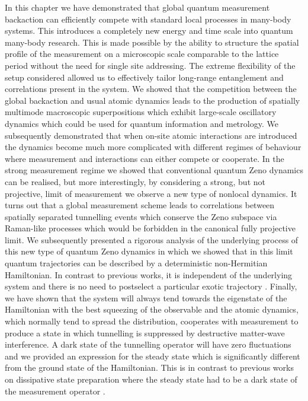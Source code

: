 In this chapter we have demonstrated that global quantum measurement
backaction can efficiently compete with standard local processes in
many-body systems. This introduces a completely new energy and time
scale into quantum many-body research. This is made possible by the
ability to structure the spatial profile of the measurement on a
microscopic scale comparable to the lattice period without the need
for single site addressing. The extreme flexibility of the setup
considered allowed us to effectively tailor long-range entanglement
and correlations present in the system. We showed that the competition
between the global backaction and usual atomic dynamics leads to the
production of spatially multimode macroscopic superpositions which
exhibit large-scale oscillatory dynamics which could be used for
quantum information and metrology. We subsequently demonstrated that
when on-site atomic interactions are introduced the dynamics become
much more complicated with different regimes of behaviour where
measurement and interactions can either compete or cooperate. In the
strong measurement regime we showed that conventional quantum Zeno
dynamics can be realised, but more interestingly, by considering a
strong, but not projective, limit of measurement we observe a new type
of nonlocal dynamics. It turns out that a global measurement scheme
leads to correlations between spatially separated tunnelling events
which conserve the Zeno subspace via Raman-like processes which would
be forbidden in the canonical fully projective limit. We subsequently
presented a rigorous analysis of the underlying process of this new
type of quantum Zeno dynamics in which we showed that in this limit
quantum trajectories can be described by a deterministic non-Hermitian
Hamiltonian. In contrast to previous works, it is independent of the
underlying system and there is no need to postselect a particular
exotic trajectory \cite{lee2014prx, lee2014prl}. Finally, we have
shown that the system will always tend towards the eigenstate of the
Hamiltonian with the best squeezing of the observable and the atomic
dynamics, which normally tend to spread the distribution, cooperates
with measurement to produce a state in which tunnelling is suppressed
by destructive matter-wave interference. A dark state of the
tunnelling operator will have zero fluctuations and we provided an
expression for the steady state which is significantly different from
the ground state of the Hamiltonian. This is in contrast to previous
works on dissipative state preparation where the steady state had to
be a dark state of the measurement operator \cite{diehl2008}.

